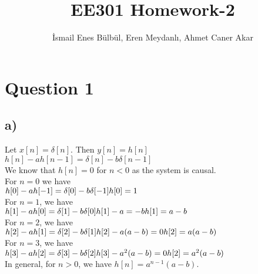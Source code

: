 \documentclass[12pt]{article}
\title{EE301 Homework-2}
\author{İsmail Enes Bülbül, Eren Meydanlı, Ahmet Caner Akar}
\begin{document}
\maketitle


    \section*{Question 1}
    \subsection*{a)}
    Let \(x[n] = \delta[n]\). Then \(y[n] = h[n]\)\\
    \begin{math}
      h[n] - ah[n-1] = \delta[n] - b\delta[n-1]
    \end{math}\\
    We know that \(h[n] = 0\) for \(n < 0\) as the system is causal.\\
    For \(n = 0\) we have\\
    \begin{math}
      h[0] - ah[-1] = \delta[0] - b\delta[-1]\\
      h[0] = 1
    \end{math}\\
    For \(n = 1\), we have\\
    \begin{math}
      h[1] - ah[0] = \delta[1] - b\delta[0]\\
      h[1] - a = -b\\
      h[1] = a - b
    \end{math}\\
    For \(n = 2\), we have\\
    \begin{math}
      h[2] - ah[1] = \delta[2] - b\delta[1]\\
      h[2] - a(a-b) = 0\\
      h[2] = a(a-b)
    \end{math}\\
    For \(n = 3\), we have\\
    \begin{math}
      h[3] - ah[2] = \delta[3] - b\delta[2]\\
      h[3] - a^2(a-b) = 0\\
      h[2] = a^2(a-b)
    \end{math}\\
    In general, for \(n > 0\), we have \(h[n] = a^{n-1}(a-b)\).\\
\end{document}
